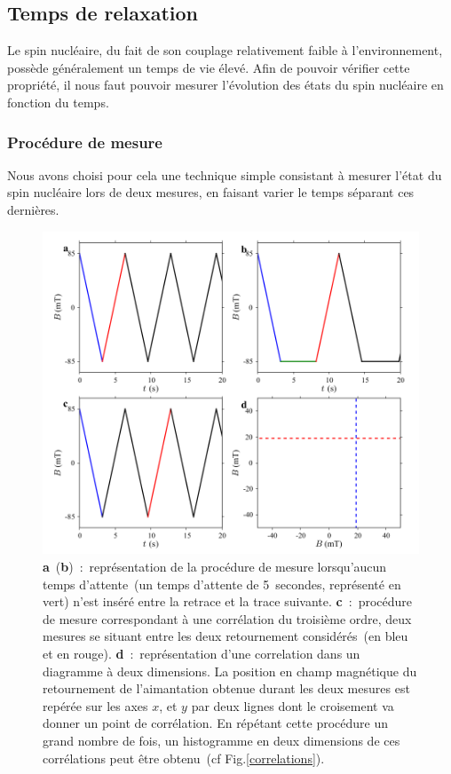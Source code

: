 \subsection{Temps de relaxation}

Le spin nucléaire, du fait de son couplage relativement faible à l’environnement, possède généralement un temps de vie élevé. Afin de pouvoir vérifier cette propriété, il nous faut pouvoir mesurer l'évolution des états du spin nucléaire en fonction du temps. 

\subsubsection{Procédure de mesure}
Nous avons choisi pour cela une technique simple consistant à mesurer l'état du spin nucléaire lors de deux mesures, en faisant varier le temps séparant ces dernières.

\begin{figure}
\centering \includegraphics[scale=0.45]{Resultats/PostFig1/postfig1.png}
\caption{\textbf{a}~(\textbf{b})~:~représentation de la procédure de mesure lorsqu'aucun temps d'attente~(un temps d'attente de 5\, secondes, représenté en vert) n'est inséré entre la retrace et la trace suivante. \textbf{c}~:~procédure de mesure correspondant à une corrélation du troisième ordre, deux mesures se situant entre les deux retournement considérés~(en bleu et en rouge). \textbf{d}~:~représentation d'une correlation dans un diagramme à deux dimensions.  La position en champ magnétique du retournement de l'aimantation obtenue durant les deux mesures est repérée sur les axes $x$, et $y$ par deux lignes dont le croisement va donner un point de corrélation. En répétant cette procédure un grand nombre de fois, un histogramme en deux dimensions de ces corrélations peut être obtenu~(cf Fig.\ref{correlations}).}
\label{procedure}
\end{figure}


